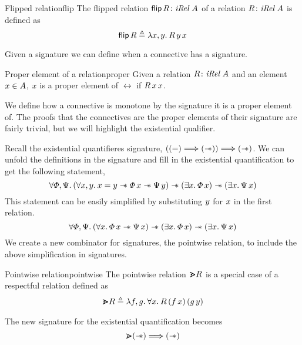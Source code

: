 \documentclass[thesis.tex]{subfiles}
\begin{document}
\begin{definition}{Flipped relation}{flip}
    The flipped relation $\bm{\textsf{\upshape flip}}\, R\colon\textit{iRel}\ A$ of a relation $R\colon\textit{iRel}\ A$ is defined as
    \[\flip\, \rel \eqdef \Lam \var, \varB. \rel\, \varB\, \var\]
\end{definition}
Given a signature we can define when a connective has a signature.
\begin{definition}{Proper element of a relation}{proper}
    Given a relation $R\colon\textit{iRel}\ A$ and an element $x\in A$, $x$ is a proper element of $\rel$ if $R\, x\, x$.
\end{definition}
We define how a connective is monotone by the signature it is a proper element of. The proofs that the connectives are the proper elements of their signature are fairly trivial, but we will highlight the existential qualifier.

Recall the existential quantifieres signature, $((=) \mathrel{\bm{\Longrightarrow}} (\mathrel{-\!\!\ast})) \mathrel{\bm{\Longrightarrow}} (\mathrel{-\!\!\ast})$. We can unfold the definitions in the signature and fill in the existential quantification to get the following statement,
\[\All \pred, \predB. (\All \var, \varB. \var = \varB \wand \pred\, \var \wand \predB\, \varB) \wand (\Exists \var. \pred\, \var) \wand (\Exists \var. \predB\, \var) \]
This statement can be easily simplified by substituting $y$ for $x$ in the first relation.
\[\All \pred, \predB. (\All \var. \pred\, \var \wand \predB\, \var) \wand (\Exists \var. \pred\, \var) \wand (\Exists \var. \predB\, \var) \]
We create a new combinator for signatures, the pointwise relation, to include the above simplification in signatures.
\begin{definition}{Pointwise relation}{pointwise}
    The pointwise relation $\bm{\gtrdot} R$ is a special case of a respectful relation defined as
    \begin{align*}
        \point \rel \eqdef \Lam \func, \funcB. \All \var. \rel\, (\func\, \var)\, (\funcB\, \varB)
    \end{align*}
\end{definition}
The new signature for the existential quantification becomes
\[\bm{\gtrdot} (\mathrel{-\!\!\ast}) \mathrel{\bm{\Longrightarrow}} (\mathrel{-\!\!\ast})\]
\end{document}
